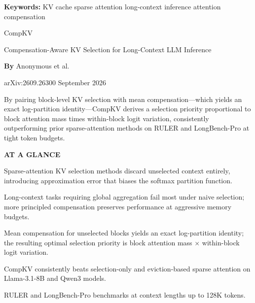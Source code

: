 \documentclass[10pt,twocolumn]{article}
\begin{document}
\setlength{\parindent}{0pt}
\setlength{\parskip}{4pt}

{\small\color{keywordgray}\textbf{Keywords:}
  KV cache \textbullet{}
  sparse attention \textbullet{}
  long-context inference \textbullet{}
  attention compensation}\par\vspace{4pt}

{\LARGE\bfseries\raggedright
  CompKV}\par\vspace{4pt}

{\large\itshape\raggedright
  Compensation-Aware KV Selection for Long-Context LLM Inference}\par\vspace{6pt}

{\small\textbf{By} Anonymous et al.}\par\vspace{2pt}

{\small\color{keywordgray}arXiv:2609.26300 \textbullet{} September 2026}
\par\vspace{2pt}\noindent{\color{rulered}\rule{\columnwidth}{0.6pt}}\vspace{6pt}

By pairing block-level KV selection with mean compensation---which yields an exact
log-partition identity---CompKV derives a selection priority proportional to block
attention mass times within-block logit variation, consistently outperforming
prior sparse-attention methods on RULER and LongBench-Pro at tight token budgets.

\begin{mdframed}[backgroundcolor=boxgray,linecolor=rulered,linewidth=1pt,
    innerleftmargin=6pt,innerrightmargin=6pt,
    innertopmargin=6pt,innerbottommargin=6pt]
\textbf{\small AT A GLANCE}\par\vspace{4pt}
\begin{description}[leftmargin=0pt,labelsep=4pt,itemsep=2pt,parsep=0pt,
    font=\small\bfseries]
  \item[Problem:] Sparse-attention KV selection methods discard unselected
    context entirely, introducing approximation error that biases the softmax
    partition function.
  \item[Why it matters:] Long-context tasks requiring global aggregation fail
    most under naive selection; more principled compensation preserves performance
    at aggressive memory budgets.
  \item[Method:] Mean compensation for unselected blocks yields an exact
    log-partition identity; the resulting optimal selection priority is
    block attention mass $\times$ within-block logit variation.
  \item[Result:] CompKV consistently beats selection-only and eviction-based
    sparse attention on Llama-3.1-8B and Qwen3 models.
  \item[Evidence:] RULER and LongBench-Pro benchmarks at context lengths
    up to 128K tokens.
\end{description}
\end{mdframed}
\end{document}
